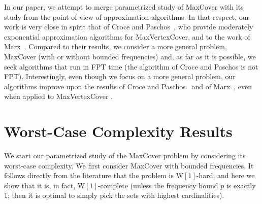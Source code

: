 \documentclass[11pt]{article}
\newcommand{\wone}{{\mathrm{W[1]}}}
\begin{document}
In our paper, we attempt to merge parametrized study of MaxCover with
its study from the point of view of approximation algorithms.  In that
respect, our work is very close in spirit that of Croce and
Paschos~\cite{cro-pas:j:cover}, who provide moderately exponential
approximation algorithms for MaxVertexCover, and to the work of
Marx~\cite{Marx06parameterizedcomplexity}.  Compared to their results,
we consider a more general problem, MaxCover (with or without bounded
frequencies) and, as far as it is possible, we seek algorithms that
run in FPT time (the algorithm of Croce and Paschos is not
FPT). Interestingly, even though we focus on a more general problem,
our algorithms improve upon the results of Croce and
Paschos~\cite{cro-pas:j:cover} and of
Marx~\cite{Marx06parameterizedcomplexity}, even when applied to
MaxVertexCover
.








\section{Worst-Case Complexity Results}\label{sec:worst-case}

We start our parametrized study of the MaxCover problem by
considering its worst-case complexity. We first consider MaxCover with
bounded frequencies. It follows directly from the literature that the
problem is $\wone$-hard, and here we show that it is, in fact,
$\wone$-complete (unless the frequency bound $p$ is exactly $1$; then
it is optimal to simply pick the sets with highest cardinalities).
\end{document}
